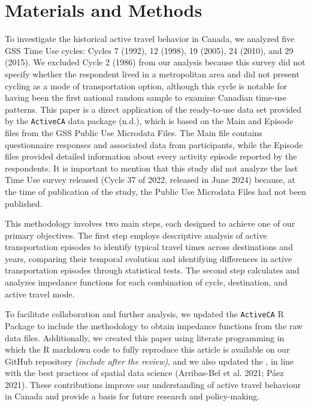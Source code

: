 \documentclass[preprint, 3p,
authoryear]{elsarticle} %
\begin{document}
\section{Materials and Methods}\label{materials-and-methods}

To investigate the historical active travel behavior in Canada, we
analyzed five GSS Time Use cycles: Cycles 7 (1992), 12 (1998), 19
(2005), 24 (2010), and 29 (2015). We excluded Cycle 2 (1986) from our
analysis because this survey did not specify whether the respondent
lived in a metropolitan area and did not present cycling as a mode of
transportation option, although this cycle is notable for having been
the first national random sample to examine Canadian time-use patterns.
This paper is a direct application of the ready-to-use data set provided
by the \texttt{ActiveCA} data package (n.d.), which is based on the Main
and Episode files from the GSS Public Use Microdata Files. The Main file
contains questionnaire responses and associated data from participants,
while the Episode files provided detailed information about every
activity episode reported by the respondents. It is important to mention
that this study did not analyze the last Time Use survey released (Cycle
37 of 2022, released in June 2024) because, at the time of publication
of the study, the Public Use Microdata Files had not been published.

This methodology involves two main steps, each designed to achieve one
of our primary objectives. The first step employs descriptive analysis
of active transportation episodes to identify typical travel times
across destinations and years, comparing their temporal evolution and
identifying differences in active transportation episodes through
statistical tests. The second step calculates and analyzes impedance
functions for each combination of cycle, destination, and active travel
mode.

To facilitate collaboration and further analysis, we updated the
\texttt{ActiveCA} R Package to include the methodology to obtain
impedance functions from the raw data files. Additionally, we created
this paper using literate programming in which the R markdown code to
fully reproduce this article is available on our GitHub repository
\emph{(include after the review)}, and we also updated the , in line
with the best practices of spatial data science (Arribas-Bel et al.
2021; Páez 2021). These contributions improve our understanding of
active travel behaviour in Canada and provide a basis for future
research and policy-making.
\end{document}
